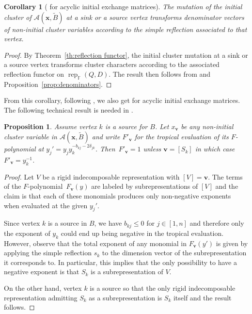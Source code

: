 \documentclass[12pt]{amsart}
\newtheorem{corollary}[theorem]{Corollary}
\newtheorem{proposition}[theorem]{Proposition}
\newcommand{\bfv}{\mathbf{v}}
\newcommand{\bfx}{\mathbf{x}}
\newcommand{\cA}{\mathcal{A}}
\newcommand{\FF}{\mathbb{F}}
\newcommand{\rep}{\operatorname{rep}}
\begin{document}
  \begin{corollary}[{\cite[Conjecture 2.8]{reading-stella}} for acyclic initial exchange matrices]
    The mutation of the initial cluster of $\cA(\bfx,\widetilde{B})$ at a sink or a source vertex transforms denominator vectors of non-initial cluster variables according to the simple reflection associated to that vertex.
  \end{corollary}
  \begin{proof}
    By Theorem~\ref{th:reflection functor}, the initial cluster mutation at a sink or a source vertex transforms cluster characters according to the associated reflection functor on $\rep_{\FF}(Q,D)$.
    The result then follows from \cite[Proposition 2.1]{dlab-ringel} and Proposition~\ref{prop:denominators}.
  \end{proof}

  From this corollary, following \cite[Proposition 2.10]{reading-stella}, we also get \cite[Conjecture 2.7]{reading-stella} for acyclic initial exchange matrices.
  The following technical result is needed in \cite{rupel-stella-williams}.

  \begin{proposition}
    \label{prop:principal F-polynomials}
    Assume vertex $k$ is a source for $B$.
    Let $x_\bfv$ be any non-initial cluster variable in $\cA(\bfx,\widetilde{B})$ and write $F'_\bfv$ for the tropical evaluation of its $F$-polynomial at $y_j'=y_jy_k^{-b_{kj}-2\delta_{jk}}$.
    Then~$F'_\bfv=1$ unless $\bfv=[S_k]$ in which case $F'_\bfv=y_k^{-1}$.
  \end{proposition}
  \begin{proof}
    Let $V$ be a rigid indecomposable representation with $[V]=\bfv$.
    The terms of the $F$-polynomial~$F_\bfv(y)$ are labeled by subrepresentations of $[V]$ and the claim is that each of these monomials produces only non-negative exponents when evaluated at the given $y_j'$.

    Since vertex $k$ is a source in $B$, we have $b_{kj}\leq 0$ for $j\in[1,n]$ and therefore only the exponent of $y_k$ could end up being negative in the tropical evaluation.
    However, observe that the total exponent of any monomial in $F_\bfv(y')$ is given by applying the simple reflection $s_k$ to the dimension vector of the subrepresentation it corresponds to.
    In particular, this implies that the only possibility to have a negative exponent is that $S_k$ is a subrepresentation of $V$.

    On the other hand, vertex $k$ is a source so that the only rigid indecomposable representation admitting $S_k$ as a subrepresentation is $S_k$ itself and the result follows.
  \end{proof}
\end{document}
